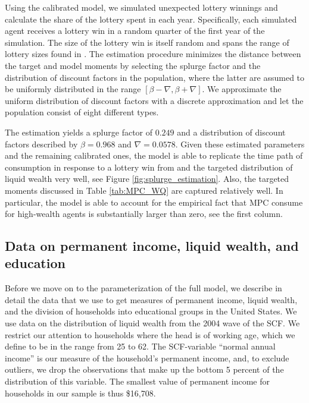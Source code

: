 \documentclass[\econtexRoot/HAFiscal]{subfiles}
\begin{document}
Using the calibrated model, we simulated unexpected lottery winnings and calculate the share of the lottery spent in each year.
Specifically, each simulated agent receives a lottery win in a random quarter of the first year of the simulation.
The size of the lottery win is itself random and spans the range of lottery sizes found in \citet{fagereng_mpc_2021}.
The estimation procedure minimizes the distance between the target and model moments by selecting the splurge factor and the distribution of discount factors in the population, where the latter are assumed to be uniformly distributed in the range $[\beta-\nabla, \beta+\nabla]$.
We approximate the uniform distribution of discount factors with a discrete approximation and let the population consist of eight different types.

The estimation yields a splurge factor of $0.249$ and a distribution of discount factors described by $\beta = 0.968$ and $\nabla=0.0578$.
Given these estimated parameters and the remaining calibrated ones, the model is able to replicate the time path of consumption in response to a lottery win from \citet{fagereng_mpc_2021} and the targeted distribution of liquid wealth very well, see Figure \ref{fig:splurge_estimation}.
Also, the targeted moments discussed in Table \ref{tab:MPC_WQ} are captured relatively well.
In particular, the model is able to account for the empirical fact that MPC consume for high-wealth agents is substantially larger than zero, see the first column.




 

\hypertarget{data-on-permanent-income-liquid-wealth-and-education}{}\par\subsection{Data on permanent income, liquid wealth, and education}
\notinsubfile{\label{sec:SCFdata}}

Before we move on to the parameterization of the full model, we describe in detail the data that we use to get measures of permanent income, liquid wealth, and the division of households into educational groups in the United States.
We use data on the distribution of liquid wealth from the 2004 wave of the SCF.
We restrict our attention to households where the head is of working age, which we define to be in the range from 25 to 62.
The SCF-variable ``normal annual income'' is our measure of the household's permanent income, and, to exclude outliers, we drop the observations that make up the bottom 5 percent of the distribution of this variable.
The smallest value of permanent income for households in our sample is thus \$16,708.
\end{document}
